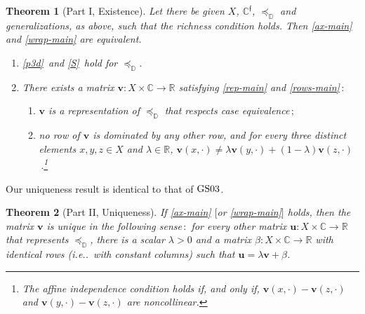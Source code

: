 \documentclass[ecta,nameyear,draft]{econsocart}
\makeatletter
\newcommand{\R}{\mathbb R}
\newcommand{\novel}{\mathfrak f}
\newcommand{\preceqb}{\mathbin{\preceq}}
\newcommand{\mbbd}{{\mathds D}}
\newcommand{\mbbc}{{\mathds C}}
\newcommand{\mbbcp}{{\mathds C^{\novel}}}
\newcommand{\mbbt}{{\mathds {T}}}
\newcommand\ie{i\@.e\@ifnextchar.{}{.\@}}
\newcommand{\gsii}{$\textup{GS03}$}
\theoremstyle{plain}
\newtheorem{theorem}{Theorem}%
\theoremstyle{remark}
\makeatother
\begin{document}
\begin{theorem}[Part I, Existence]\label{thm-main} Let there be given $X$,
  $\mbbcp$, $\preceqb_ \mbbd$ and generalizations, as above, such that the
  richness condition holds. Then \ref{ax-main} and \ref{wrap-main} are
  equivalent.
  \begin{enumerate}[label=\textup{(\ref{thm-main}.\roman*)}]
    \item\label{ax-main} \ref{p3d}\ and \ref{S}\ hold for $\preceq_{\mbbd}$.
    \item\label{wrap-main} There exists a matrix $\mathbf{v} : X \times \mbbc
      \rightarrow \R$ satisfying \ref{rep-main} and \ref{rows-main}$\,:$
      \begin{enumerate}[label=\textup{(\ref{thm-main}.\alph*)}]
        \item\label{rep-main} $\mathbf{v}$ is a representation of
          $\preceq_{\mbbd}$ that respects case equivalence$\,;$
        \item\label{rows-main} no row of $\mathbf{v}$ is dominated by any other
          row, and for every three distinct elements $x,y, z \in X$ and
          $\lambda \in \R$, $\mathbf{v} (x, \cdot) \neq \lambda
          \mathbf{v}(y,\cdot) + (1-\lambda)
          \mathbf{v}(z,\cdot)$\,.\footnote{The affine independence condition 
            holds if, and only if, $\mathbf{v}(x,\cdot)- \mathbf{v}(z,\cdot)$
          and $\mathbf{v}(y,\cdot)-\mathbf{v}(z,\cdot)$ are noncollinear.}
      \end{enumerate}
  \end{enumerate}
\end{theorem}
Our uniqueness result is identical to that of \gsii.  \setcounter{theorem}{0}
\begin{theorem}[Part II, Uniqueness]%
  If \ref{ax-main} $[$or \ref{wrap-main}$]$ holds, then the matrix $\mathbf{v}$
  is unique in the following sense$\,:$ for every other matrix $\mathbf{u} : X
  \times \mbbc \rightarrow \R$ that represents $\preceqb_{\mbbd}$, there is a
  scalar $\lambda > 0$ and a matrix $\beta : X \times \mbbc \rightarrow \R$
  with identical rows (\ie\ with constant columns) such that $\mathbf{u} =
  \lambda \mathbf{v} + \beta$.
\end{theorem}

\end{document}
